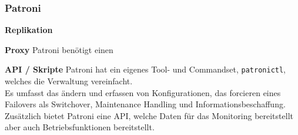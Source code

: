 
\subsubsection{Patroni}
\begin{flushleft}
    
\end{flushleft}
\begin{flushleft}
    \textbf{Replikation}

\end{flushleft}
\begin{flushleft}
    \textbf{Proxy}
    Patroni benötigt einen \cite{VYXTI7BS}
\end{flushleft}
\begin{flushleft}
    \textbf{API / Skripte}
    Patroni hat ein eigenes Tool- und Commandset, \texttt{patronictl}, welches die Verwaltung vereinfacht.\\
    Es umfasst das ändern und erfassen von Konfigurationen, das forcieren eines Failovers als Switchover, Maintenance Handling und Informationsbeschaffung.\\

    Zusätzlich bietet Patroni eine API, welche Daten für das Monitoring bereitstellt aber auch Betriebsfunktionen bereitstellt.\\
\end{flushleft}